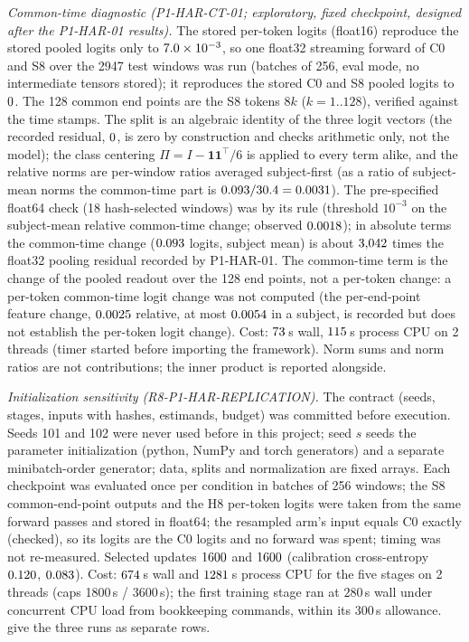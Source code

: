 \documentclass{article}
\theoremstyle{plain}
\theoremstyle{definition}
\theoremstyle{remark}
\begin{document}
\emph{Common-time diagnostic (P1-HAR-CT-01; exploratory, fixed checkpoint, designed after the P1-HAR-01 results).} The stored per-token logits (float16) reproduce the stored pooled logits only to $7.0\times10^{-3}$, so one float32 streaming forward of C0 and S8 over the 2947 test windows was run (batches of 256, eval mode, no intermediate tensors stored); it reproduces the stored C0 and S8 pooled logits to $0$. The 128 common end points are the S8 tokens $8k$ ($k=1..128$), verified against the time stamps. The split is an algebraic identity of the three logit vectors (the recorded residual, $0$, is zero by construction and checks arithmetic only, not the model); the class centering $\Pi=I-\mathbf{1}\mathbf{1}^{\top}/6$ is applied to every term alike, and the relative norms are per-window ratios averaged subject-first (as a ratio of subject-mean norms the common-time part is $0.093/30.4=0.0031$). The pre-specified float64 check (18 hash-selected windows) was \texttt{\HarCtFpSixtyFour} by its rule (threshold $10^{-3}$ on the subject-mean relative common-time change; observed $0.0018$); in absolute terms the common-time change ($0.093$ logits, subject mean) is about $3{,}042$ times the float32 pooling residual recorded by P1-HAR-01. The common-time term is the change of the pooled readout over the 128 end points, not a per-token change: a per-token common-time logit change was not computed (the per-end-point feature change, $0.0025$ relative, at most $0.0054$ in a subject, is recorded but does not establish the per-token logit change). Cost: $73$\,s wall, $115$\,s process CPU on 2 threads (timer started before importing the framework). Norm sums and norm ratios are not contributions; the inner product is reported alongside.



\emph{Initialization sensitivity (R8-P1-HAR-REPLICATION).} The contract (seeds, stages, inputs with hashes, estimands, budget) was committed before execution. Seeds 101 and 102 were never used before in this project; seed $s$ seeds the parameter initialization (python, NumPy and torch generators) and a separate minibatch-order generator; data, splits and normalization are fixed arrays. Each checkpoint was evaluated once per condition in batches of 256 windows; the S8 common-end-point outputs and the H8 per-token logits were taken from the same forward passes and stored in float64; the resampled arm's input equals C0 exactly (checked), so its logits are the C0 logits and no forward was spent; timing was not re-measured. Selected updates $1600$ and $1600$ (calibration cross-entropy $0.120$, $0.083$). Cost: $674$\,s wall and $1281$\,s process CPU for the five stages on 2 threads (caps 1800\,s / 3600\,s); the first training stage ran at $280$\,s wall under concurrent CPU load from bookkeeping commands, within its 300\,s allowance.  give the three runs as separate rows.
\end{document}

